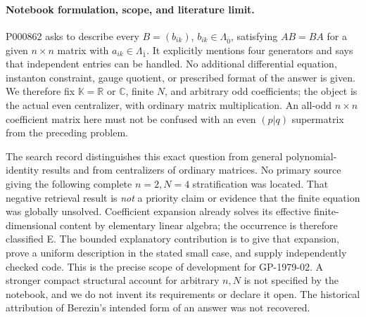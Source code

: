 \paragraph{Notebook formulation, scope, and literature limit.}
P000862 asks to describe every \(B=(b_{ik})\), \(b_{ik}\in\Lambda_{\bar0}\), satisfying \(AB=BA\) for a given \(n\times n\) matrix with \(a_{ik}\in\Lambda_{\bar1}\). It explicitly mentions four generators and says that independent entries can be handled. No additional differential equation, instanton constraint, gauge quotient, or prescribed format of the answer is given. We therefore fix \(\mathbb K=\mathbb R\) or \(\mathbb C\), finite \(N\), and arbitrary odd coefficients; the object is the actual even centralizer, with ordinary matrix multiplication. An all-odd \(n\times n\) coefficient matrix here must not be confused with an even \((p|q)\) supermatrix from the preceding problem.

The search record distinguishes this exact question from general polynomial-identity results and from centralizers of ordinary matrices. No primary source giving the following complete \(n=2,N=4\) stratification was located. That negative retrieval result is \emph{not} a priority claim or evidence that the finite equation was globally unsolved. Coefficient expansion already solves its effective finite-dimensional content by elementary linear algebra; the occurrence is therefore classified E. The bounded explanatory contribution is to give that expansion, prove a uniform description in the stated small case, and supply independently checked code. This is the precise scope of development for GP-1979-02. A stronger compact structural account for arbitrary \(n,N\) is not specified by the notebook, and we do not invent its requirements or declare it open. The historical attribution of Berezin's intended form of an answer was not recovered.

